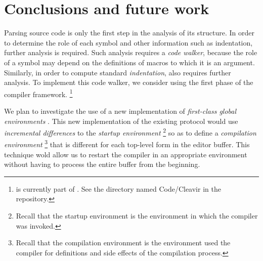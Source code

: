 \section{Conclusions and future work}

Parsing \commonlisp{} source code is only the first step in the
analysis of its structure.  In order to determine the role of each
symbol and other information such as indentation, further analysis is
required.  Such analysis requires a \emph{code walker}, because the
role of a symbol may depend on the definitions of macros to which it
is an argument.  Similarly, in order to compute standard
\emph{indentation}, also requires further analysis.  To implement this
code walker, we consider using the first phase of the \cleavir{}
compiler framework.%
\footnote{\cleavir{} is currently part of \sicl{}.  See the directory
  named Code/Cleavir in the \sicl{} repository.}

We plan to investigate the use of a new implementation of
\emph{first-class global environments}
\cite{Strandh:2015:ELS:Environments}.  This new implementation of the
existing \clos{} protocol would use \emph{incremental differences} to
the \emph{startup environment}%
\footnote{Recall that the startup environment is the environment in
  which the compiler was invoked.}
so as to define a \emph{compilation environment}%
\footnote{Recall that the compilation environment is the environment
  used the compiler for definitions and side effects of the
  compilation process.}
that is different for each top-level form in the editor buffer.  This
technique wold allow us to restart the compiler in an appropriate
environment without having to process the entire buffer from the
beginning.
